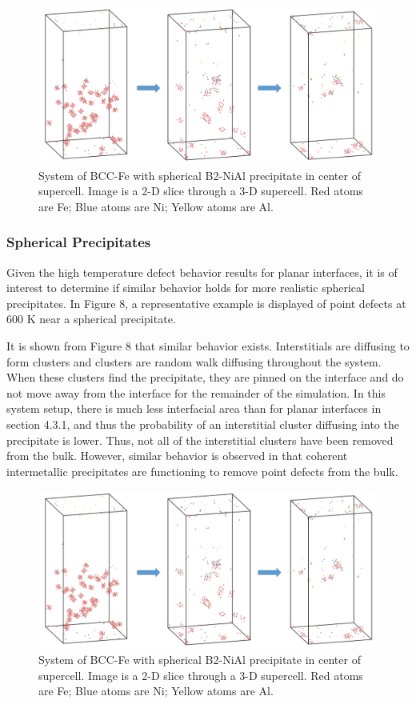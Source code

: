 \documentclass[review]{elsarticle}
\begin{document}
\begin{figure}[htp]
   \centering
   \includegraphics[width=\textwidth]{int_diff_nf.png} 
   \caption{System of BCC-Fe with spherical B2-NiAl precipitate in center of supercell.  Image is a 2-D slice through a 3-D supercell.  Red atoms are Fe; Blue atoms are Ni; Yellow atoms are Al.}
   \label{fig:example}
\end{figure}

\subsubsection{Spherical Precipitates}
Given the high temperature defect behavior results for planar interfaces, it is of interest to determine if similar behavior holds for more realistic spherical precipitates.  In Figure 8, a representative example is displayed of point defects at 600 K near a spherical precipitate.  

It is shown from Figure 8 that similar behavior exists.  Interstitials are diffusing to form clusters and clusters are random walk diffusing throughout the system.  When these clusters find the precipitate, they are pinned on the interface and do not move away from the interface for the remainder of the simulation.  In this system setup, there is much less interfacial area than for planar interfaces in section 4.3.1, and thus the probability of an interstitial cluster diffusing into the precipitate is lower.  Thus, not all of the interstitial clusters have been removed from the bulk.  However, similar behavior is observed in that coherent intermetallic precipitates are functioning to remove point defects from the bulk.

\begin{figure}[htp]
   \centering
   \includegraphics[width=\textwidth]{int_diff_nf.png} 
   \caption{System of BCC-Fe with spherical B2-NiAl precipitate in center of supercell.  Image is a 2-D slice through a 3-D supercell.  Red atoms are Fe; Blue atoms are Ni; Yellow atoms are Al.}
   \label{fig:example}
\end{figure}
\end{document}
